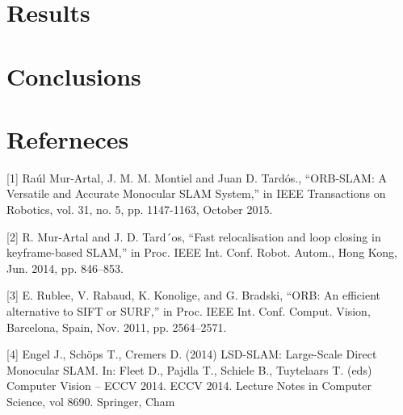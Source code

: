 \documentclass[letterpaper, 12 pt, conference]{ieeeconf}  %
\begin{document}
\section{Results}
\label{sec:Results}


\section{Conclusions}
\label{conclusion}


\section{Referneces}

[1] Raúl Mur-Artal, J. M. M. Montiel and Juan D. Tardós., “ORB-SLAM: A Versatile and Accurate Monocular SLAM System,” in IEEE Transactions on Robotics, vol. 31, no. 5, pp. 1147-1163, October 2015.

[2] R. Mur-Artal and J. D. Tard´os, “Fast relocalisation and loop closing in keyframe-based SLAM,” in Proc. IEEE Int. Conf. Robot. Autom., Hong Kong, Jun. 2014, pp. 846–853.

[3] E. Rublee, V. Rabaud, K. Konolige, and G. Bradski, “ORB: An efficient alternative to SIFT or SURF,” in Proc. IEEE Int. Conf. Comput. Vision, Barcelona, Spain, Nov. 2011, pp. 2564–2571.

[4] Engel J., Schöps T., Cremers D. (2014) LSD-SLAM: Large-Scale Direct Monocular SLAM. In: Fleet D., Pajdla T., Schiele B., Tuytelaars T. (eds) Computer Vision – ECCV 2014. ECCV 2014. Lecture Notes in Computer Science, vol 8690. Springer, Cham

\addtolength{\textheight}{-12cm}   %










%
%
\end{document}
